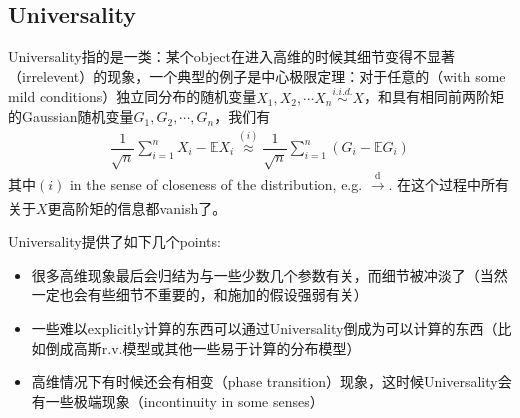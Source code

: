 \documentclass[11pt,a4paper]{ctexart}
\numberwithin{equation}{section}%
\begin{document}
\subsection{Universality}

Universality指的是一类：某个object在进入高维的时候其细节变得不显著（irrelevent）的现象，一个典型的例子是中心极限定理：对于任意的（with some mild conditions）独立同分布的随机变量$ X_1,X_2,\cdots X_n \mathop{ \sim  }\limits^{i.i.d.} X$，和具有相同前两阶矩的Gaussian随机变量$ G_1,G_2,\cdots,G_n $，我们有
\begin{align*}
    \dfrac{ 1 }{ \sqrt{n} }\sum_{i=1}^n X_i-\mathbb{E}X_i \mathop{ \approx  }\limits^{(i)} \dfrac{ 1 }{ \sqrt{n} }\sum_{i=1}^n (G_i-\mathbb{E}G_i)
\end{align*}
其中$ (i) $ in the sense of closeness of the distribution, e.g. $ \xrightarrow[]{\mathrm{d}}  $. 在这个过程中所有关于$ X $更高阶矩的信息都vanish了。

Universality提供了如下几个points:
\begin{itemize}[topsep=2pt,itemsep=0pt]
    \item 很多高维现象最后会归结为与一些少数几个参数有关，而细节被冲淡了（当然一定也会有些细节不重要的，和施加的假设强弱有关）
    \item 一些难以explicitly计算的东西可以通过Universality倒成为可以计算的东西（比如倒成高斯r.v.模型或其他一些易于计算的分布模型）
    \item 高维情况下有时候还会有相变（phase transition）现象，这时候Universality会有一些极端现象（incontinuity in some senses）
\end{itemize}

    















    

    
\end{document}
